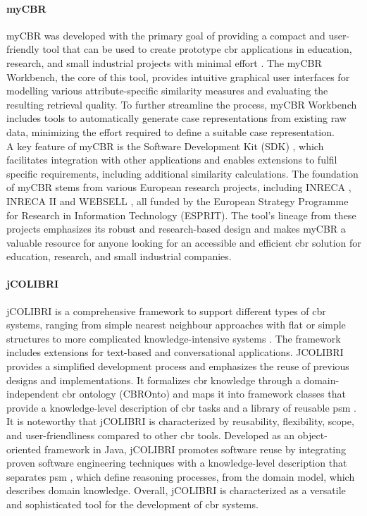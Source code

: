             \paragraph{myCBR}
            myCBR was developed with the primary goal of providing a compact and user-friendly tool that can be used to create prototype \acrfull{cbr} applications in education, research, and small industrial projects with minimal effort \cite{sawalkar2019modeling}. The myCBR Workbench, the core of this tool, provides intuitive graphical user interfaces for modelling various attribute-specific similarity measures and evaluating the resulting retrieval quality. To further streamline the process, myCBR Workbench includes tools to automatically generate case representations from existing raw data, minimizing the effort required to define a suitable case representation.\\
            A key feature of myCBR is the Software Development Kit (SDK) \cite{jaiswal2022f}, which facilitates integration with other applications and enables extensions to fulfil specific requirements, including additional similarity calculations. The foundation of myCBR stems from various European research projects, including INRECA \cite{wilke1995fallbasiertes}, INRECA II and WEBSELL \cite{probSolCBR}, all funded by the European Strategy Programme for Research in Information Technology (ESPRIT). The tool's lineage from these projects emphasizes its robust and research-based design and makes myCBR a valuable resource for anyone looking for an accessible and efficient \acrshort{cbr} solution for education, research, and small industrial companies.

        
            \paragraph{jCOLIBRI}
            jCOLIBRI is a comprehensive framework to support different types of \acrshort{cbr} systems, ranging from simple nearest neighbour approaches with flat or simple structures to more complicated knowledge-intensive systems \cite{wiratunga2011case}. The framework includes extensions for text-based and conversational applications. JCOLIBRI provides a simplified development process and emphasizes the reuse of previous designs and implementations. It formalizes \acrshort{cbr} knowledge through a domain-independent \acrshort{cbr} ontology (CBROnto) and maps it into framework classes that provide a knowledge-level description of \acrshort{cbr} tasks and a library of reusable \acrfull{psm} \cite{diaz2007building}. It is noteworthy that jCOLIBRI is characterized by reusability, flexibility, scope, and user-friendliness compared to other \acrshort{cbr} tools. Developed as an object-oriented framework in Java, jCOLIBRI promotes software reuse by integrating proven software engineering techniques with a knowledge-level description that separates \acrshort{psm} \cite{diaz2007building}, which define reasoning processes, from the domain model, which describes domain knowledge. Overall, jCOLIBRI is characterized as a versatile and sophisticated tool for the development of \acrshort{cbr} systems.

